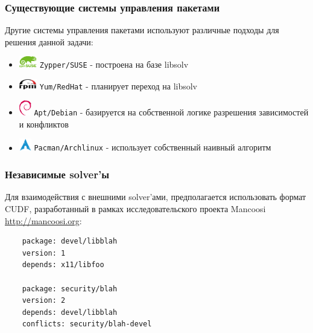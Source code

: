 \documentclass{beamer}
\begin{document}
\begin{frame}
\frametitle{Существующие системы управления пакетами}

Другие системы управления пакетами используют различные подходы для решения
данной задачи:
\begin{itemize}
  \item \includegraphics[width=22pt]{suse.pdf} \hspace{5pt} \texttt{Zypper/SUSE}
  - построена на базе libsolv
  \item \includegraphics[width=22pt]{rpm.pdf} \hspace{5pt} \texttt{Yum/RedHat} -
  планирует переход на libsolv
  \item \includegraphics[width=15pt]{debian.pdf} \hspace{12pt}
  \texttt{Apt/Debian} - базируется на собственной логике разрешения зависимостей
  и конфликтов
  \item \includegraphics[width=15pt]{arch.pdf} \hspace{12pt}
  \texttt{Pacman/Archlinux} - использует собственный наивный алгоритм
\end{itemize}

\end{frame}

\begin{frame}[fragile]
\frametitle{Независимые solver'ы}
Для взаимодействия с внешними solver'ами, предполагается использовать формат
CUDF, разработанный в рамках исследовательского проекта Mancoosi
\url{http://mancoosi.org}:
\bigskip
{\small
	\begin{verbatim}
	package: devel/libblah
	version: 1
	depends: x11/libfoo

	package: security/blah
	version: 2
	depends: devel/libblah
	conflicts: security/blah-devel
	
	\end{verbatim}
}
\end{frame}
\end{document}

